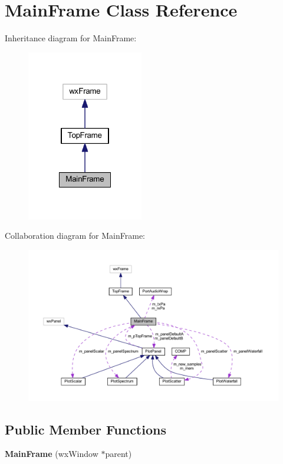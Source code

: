 \hypertarget{class_main_frame}{\section{Main\-Frame Class Reference}
\label{class_main_frame}
}


Inheritance diagram for Main\-Frame\-:\nopagebreak
\begin{figure}[H]
\begin{center}
\leavevmode
\includegraphics[width=144pt]{class_main_frame__inherit__graph}
\end{center}
\end{figure}


Collaboration diagram for Main\-Frame\-:\nopagebreak
\begin{figure}[H]
\begin{center}
\leavevmode
\includegraphics[width=350pt]{class_main_frame__coll__graph}
\end{center}
\end{figure}
\subsection*{Public Member Functions}
\begin{DoxyCompactItemize}
\item 
\hypertarget{class_main_frame_a394b51dbf31b7430ecad3f6ee1007e22}{{\bfseries Main\-Frame} (wx\-Window $\ast$parent)}\label{class_main_frame_a394b51dbf31b7430ecad3f6ee1007e22}

\end{DoxyCompactItemize}
